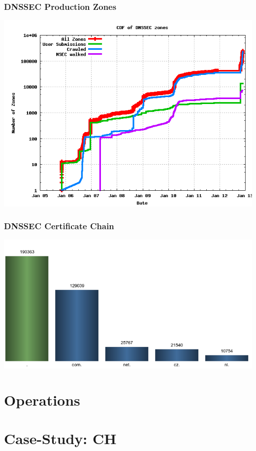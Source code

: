 \documentclass{beamer}
\begin{document}
\begin{frame}
  \frametitle{DNSSEC Production Zones}
  \includegraphics[width=\textwidth]{dnssec-growth}
\end{frame}

\begin{frame}
  \frametitle{DNSSEC Certificate Chain}
  \includegraphics[width=\textwidth]{dnssec-on-tlds}

\end{frame}

\section{Operations}


\section{Case-Study: CH}
\end{document}
